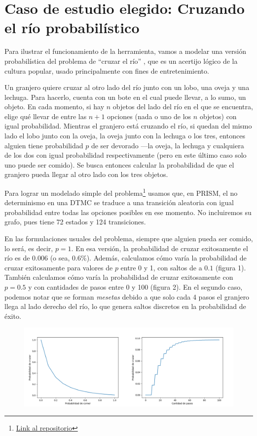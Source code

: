 \documentclass[runningheads]{llncs}
\begin{document}
\section{Caso de estudio elegido: Cruzando el río probabilístico}
Para ilustrar el funcionamiento de la herramienta, vamos a modelar una versión probabilística del problema de ``cruzar el río'' \cite{Voolaid2007}, que es un acertijo lógico de la cultura popular, usado principalmente con fines de entretenimiento.

Un granjero quiere cruzar al otro lado del río junto con un lobo, una oveja y una lechuga. Para hacerlo, cuenta con un bote en el cual puede llevar, a lo sumo, un objeto. En cada momento, si hay $n$ objetos del lado del río en el que se encuentra, elige qué llevar de entre las $n+1$ opciones (nada o uno de los $n$ objetos) con igual probabilidad. Mientras el granjero está cruzando el río, si quedan del mismo lado el lobo junto con la oveja, la oveja junto con la lechuga o los tres, entonces alguien tiene probabilidad $p$ de ser devorado —la oveja, la lechuga y cualquiera de los dos con igual probabilidad respectivamente (pero en este último caso solo uno puede ser comido). Se busca entonces calcular la probabilidad de que el granjero pueda llegar al otro lado con los tres objetos.

Para lograr un modelado simple del problema\footnote[1]{\href{https://github.com/JulietaStorino/Software-Engineering-II-FAMAF/blob/main/caso_estudio/crossing.pm}{Link al repositorio}} usamos que, en PRISM, el no determinismo en una DTMC se traduce a una transición aleatoria con igual probabilidad entre todas las opciones posibles en ese momento. No incluiremos su grafo, pues tiene 72 estados y 124 transiciones.

En las formulaciones usuales del problema, siempre que alguien pueda ser comido, lo será, es decir, $p=1$. En esa versión, la probabilidad de cruzar exitosamente el río es de $0.006$ (o sea, $0.6\%$). Además, calculamos cómo varía la probabilidad de cruzar exitosamente para valores de $p$ entre 0 y 1, con saltos de a $0.1$ (figura 1). También calculamos cómo varía la probabilidad de cruzar exitosamente con $p=0.5$ y con cantidades de pasos entre 0 y 100 (figura 2). En el segundo caso, podemos notar que se forman \textit{mesetas} debido a que solo cada 4 pasos el granjero llega al lado derecho del río, lo que genera saltos discretos en la probabilidad de éxito.

\begin{figure}
  \centering
  \includegraphics[width=12cm]{graficos.png}
\end{figure}
\end{document}
